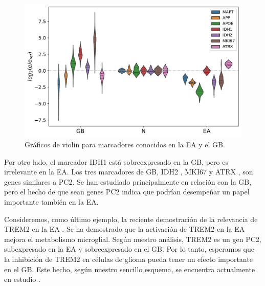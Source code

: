 \begin{figure}[!htb]
	\centering
	\includegraphics[width=\linewidth]{figures/suppl2}
	\caption{Gráficos de violín para marcadores conocidos en la EA y el GB.}
	\label{fig:violin}
\end{figure}

Por otro lado, el marcador IDH1 \cite{Cohen_2013} está sobreexpresado en la GB, pero es irrelevante en la EA. Los tres marcadores de GB, IDH2 \cite{Cohen_2013}, MKI67 \cite{Chen_2015} y ATRX \cite{Haase_2018}, son genes similares a PC2. Se han estudiado principalmente en relación con la GB, pero el hecho de que sean genes PC2 indica que podrían desempeñar un papel importante también en la EA.

Consideremos, como último ejemplo, la reciente demostración de la relevancia de TREM2 en la EA \cite{van_Lengerich_2023}. Se ha demostrado que la activación de TREM2 en la EA mejora el metabolismo microglial. Según nuestro análisis, TREM2 es un gen PC2, subexpresado en la EA y sobreexpresado en el GB. Por lo tanto, esperamos que la inhibición de TREM2 en células de glioma pueda tener un efecto importante en el GB. Este hecho, según nuestro sencillo esquema, se encuentra actualmente en estudio \cite{Sun_2023}.

